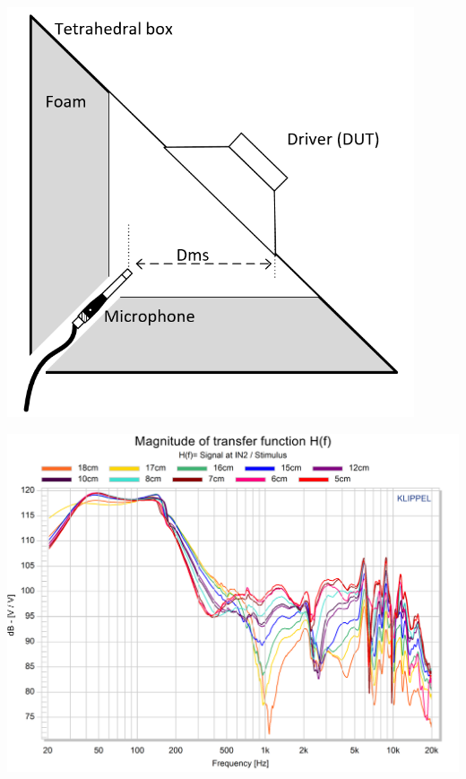 \documentclass{report}
\begin{document}
\begin{minipage}{0.35\textwidth}
\begin{center}
	\includegraphics[width=0.9\textwidth]{RoomComp/Mic_Pos_Schm} 
    \captionsetup{hypcap=false} 
	\label{fig:micpos_schema}
\end{center}
\end{minipage}
\begin{minipage}{0.6\textwidth}
\begin{center}
	\includegraphics[width=1\textwidth]{RoomComp/MicPos_TRF} 
    \captionsetup{hypcap=false} 
	\label{fig:MicPosTRF}
\end{center}
\end{minipage}
\vspace{0.2cm} 
\end{document}
